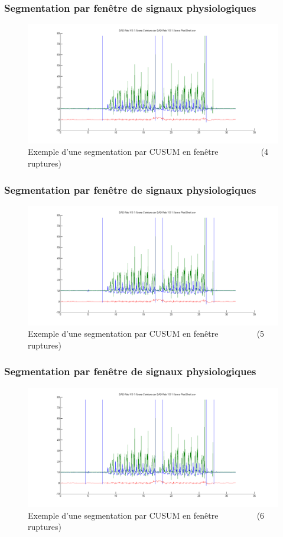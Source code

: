\documentclass{beamer}
\begin{document}
\begin{frame}
	\frametitle{Segmentation par fenêtre de signaux physiologiques}
	\begin{figure}
		\includegraphics[scale=0.3]{seg4_win.png}
		\caption{Exemple d'une segmentation par CUSUM en fenêtre
		~~~~~~~~~
		(4 ruptures)}
	\end{figure}
\end{frame}

\begin{frame}
	\frametitle{Segmentation par fenêtre de signaux physiologiques}
	\begin{figure}
		\includegraphics[scale=0.3]{seg5_win.png}
		\caption{Exemple d'une segmentation par CUSUM en fenêtre
		~~~~~~~~
		(5 ruptures)}
	\end{figure}
\end{frame}

\begin{frame}
	\frametitle{Segmentation par fenêtre de signaux physiologiques}
	\begin{figure}
		\includegraphics[scale=0.3]{seg6_win.png}
		\caption{Exemple d'une segmentation par CUSUM en fenêtre
		~~~~~~~~
		(6 ruptures)}
	\end{figure}
\end{frame}
\end{document}
